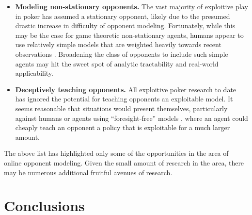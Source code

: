 \documentclass{aamas2013}
\begin{document}
\begin{itemize}
\item \textbf{Modeling non-stationary opponents.} The vast majority of exploitive play in poker has assumed a stationary opponent, likely due to the presumed drastic increase in difficulty of opponent modeling. Fortunately, while this may be the case for game theoretic non-stationary agents, humans appear to use relatively simple models that are weighted heavily towards recent observations \cite{simplemodels}. Broadening the class of opponents to include such simple agents may hit the sweet spot of analytic tractability and real-world applicability.

\item \textbf{Deceptively teaching opponents.} All exploitive poker research to date has ignored the potential for teaching opponents an exploitable model. It seems reasonable that situations would present themselves, particularly against humans or agents using ``foresight-free'' models \cite{simplemodels}, where an agent could cheaply teach an opponent a policy that is exploitable for a much larger amount.
\end{itemize}

The above list has highlighted only some of the opportunities in the area of online opponent modeling. Given the small amount of research in the area, there may be numerous additional fruitful avenues of research.

\section{Conclusions}

%

%
%

\end{document}
